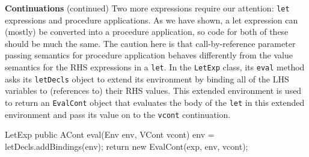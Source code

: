 \begin{minipage}[t]{\sw}
\slidenumber
\LARGE
{\bf Continuations} (continued)\exx
Two more expressions require our attention:
\verb'let' expressions and procedure applications.
As we have shown, a let expression can (mostly) be converted
into a procedure application,
so code for both of these should be much the same.
The caution here is that
call-by-reference parameter passing semantics for procedure application
behaves differently from the value semantics
for the RHS expressions in a \verb'let'.\exx
In the \verb'LetExp' class,
its \verb'eval' method asks its \verb'letDecls' object
to extend its environment
by binding all of the LHS variables
to (references to) their RHS values.
This extended environment is used
to return an \verb'EvalCont' object
that evaluates the body of the \verb'let'
in this extended environment
and pass its value on to the \verb'vcont' continuation.
\Large
\begin{qv}
LetExp
    public ACont eval(Env env, VCont vcont) {
        env = letDecls.addBindings(env);
        return new EvalCont(exp, env, vcont);
    }
\end{qv}
\end{minipage}
